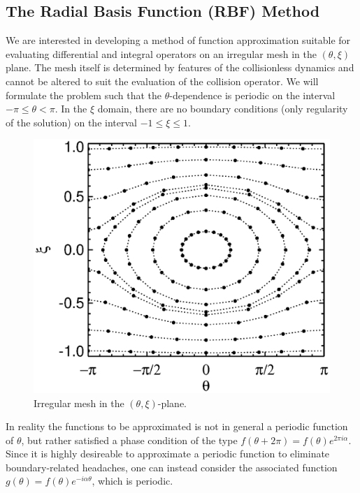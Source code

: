 \subsection{The Radial Basis Function (RBF) Method}

We are interested in developing a method of function approximation 
suitable for evaluating differential and integral operators on 
an irregular mesh in the $(\theta,\xi)$ plane.  The mesh itself
is determined by features of the collisionless dynamics and 
cannot be altered to suit the evaluation of the collision 
operator.  We will formulate the problem such that the 
$\theta$-dependence is periodic on the interval $-\pi \le \theta < \pi$.
In the $\xi$ domain, there are no boundary conditions (only
regularity of the solution) on the interval $-1 \le \xi \le 1$. 

\begin{figure}[h]
\begin{center}
\includegraphics[scale=0.7]{figures/stencil.ps}
\caption{Irregular mesh in the $(\theta,\xi)$-plane.}
\label{fig.stencil}
\end{center}
\end{figure}

In reality the functions to be approximated is not in general
a periodic function of $\theta$, but rather satisfied a phase 
condition of the type $f(\theta+2\pi) = f(\theta) e^{2\pi i \alpha}$.
Since it is highly desireable to approximate a periodic 
function to eliminate boundary-related headaches, one can 
instead consider the associated function 
$g(\theta) = f(\theta) e^{-i \alpha  \theta}$, which is periodic.
 
